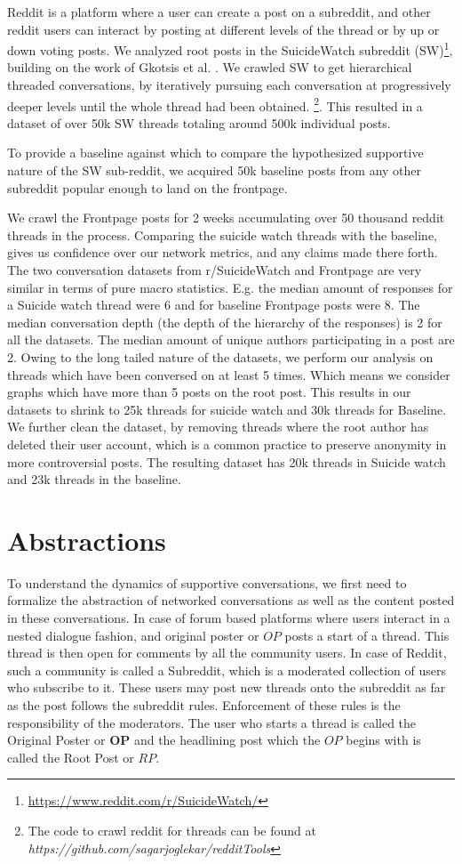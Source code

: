 Reddit is a platform where a user can create a post on a subreddit, and other reddit users can interact by posting at different levels of the thread or by up or down voting posts. We analyzed root posts in the SuicideWatch subreddit (SW)\footnote{\url{https://www.reddit.com/r/SuicideWatch/}}, building on the work of Gkotsis et al. \cite{gkotsis2017characterisation}.
We crawled SW to get hierarchical threaded conversations,
by iteratively pursuing each conversation at progressively deeper levels until the whole thread had been obtained. \footnote{The code to crawl reddit for threads can be found at \textit{https://github.com/sagarjoglekar/redditTools}}. This resulted in a dataset of over 50k SW threads totaling around 500k individual posts. 

To provide a baseline against which to compare the hypothesized supportive nature of the SW sub-reddit, we acquired 50k baseline posts from any other subreddit popular enough to land on the frontpage.

We crawl the Frontpage posts for 2 weeks accumulating over 50 thousand reddit threads in the process. 
Comparing the suicide watch threads with the baseline, gives us confidence over our network metrics, and any claims made there forth. 
The two conversation datasets from r/SuicideWatch and Frontpage are very similar in terms of pure macro statistics. E.g. the median amount of responses for a Suicide watch thread were 6 and for baseline Frontpage posts were 8. The median conversation depth (the depth of the hierarchy of the responses) is 2 for all the datasets. The median amount of unique authors participating in a post are 2. 
Owing to the long tailed nature of the datasets, we perform our analysis on threads which have been conversed on at least 5 times. Which means we consider graphs which have more than 5 posts on the root post. This results in our datasets to shrink to 25k threads for suicide watch and 30k threads for Baseline. We further clean the dataset, by removing threads where the root author has deleted their user account, which is a common practice to preserve anonymity in more controversial posts. The resulting dataset has 20k threads in Suicide watch and 23k threads in the baseline. 


\section{Abstractions}
\label{Sec:Abstractions}
To understand the dynamics of supportive conversations, we first need to formalize the abstraction of networked conversations as well as the content posted in these conversations. In case of forum based platforms where users interact in a nested dialogue fashion, and original poster or $OP$ posts a start of a thread. This thread is then open for comments by all the community users. In case of Reddit, such a community is called a Subreddit, which is a moderated collection of users who subscribe to it. These users may post new threads onto the subreddit as far as the post follows the subreddit rules. Enforcement of these rules is the responsibility of the moderators. The user who starts a thread is called the Original Poster or \textbf{OP} and the headlining post which the $OP$ begins with is called the Root Post or $RP$. 


